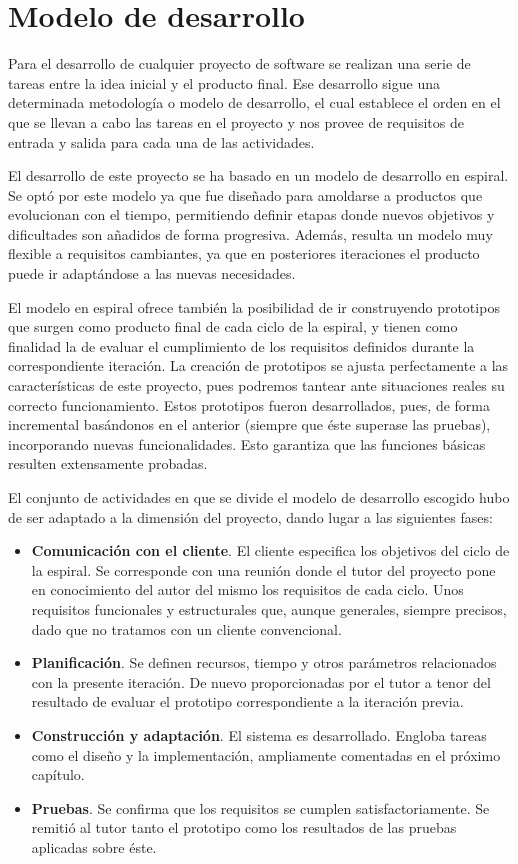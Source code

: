 \section{Modelo de desarrollo} \label{modelo}
Para el desarrollo de cualquier proyecto de software se realizan una serie de
tareas entre la idea inicial y el producto final. Ese desarrollo sigue una
determinada metodología o modelo de desarrollo, el cual
establece el orden en el que se llevan a cabo las tareas en el proyecto y
nos provee de requisitos de entrada y salida para cada una de las actividades.

El desarrollo de este proyecto se ha basado en un modelo de desarrollo
en espiral. Se optó por este modelo ya que fue diseñado para amoldarse a
productos que evolucionan con el tiempo, permitiendo definir etapas donde
nuevos objetivos y dificultades son añadidos de forma progresiva. Además,
resulta un modelo muy flexible a requisitos cambiantes, ya que en posteriores
iteraciones el producto puede ir adaptándose a las nuevas necesidades.

El modelo en espiral ofrece también la posibilidad de ir construyendo
prototipos que surgen como producto final de cada ciclo de la espiral,
y tienen como finalidad la de evaluar el cumplimiento de los requisitos
definidos durante la correspondiente iteración. La creación de prototipos
se ajusta perfectamente a las características de este proyecto, pues
podremos tantear ante situaciones reales su correcto funcionamiento.
Estos prototipos fueron desarrollados, pues, de forma incremental basándonos
en el anterior (siempre que éste superase las pruebas), incorporando nuevas
funcionalidades. Esto garantiza que las funciones básicas resulten extensamente
probadas.

El conjunto de actividades en que se divide el modelo de desarrollo escogido
hubo de ser adaptado a la dimensión del proyecto, dando lugar a las siguientes
fases:
\begin{itemize}
\item \textbf{Comunicación con el cliente}. El cliente especifica los objetivos
del ciclo de la espiral. Se corresponde con una reunión donde el tutor del
proyecto pone en conocimiento del autor del mismo los requisitos de cada ciclo.
Unos requisitos funcionales y estructurales que, aunque generales, siempre
precisos, dado que no tratamos con un cliente convencional.
\item \textbf{Planificación}. Se definen recursos, tiempo y otros parámetros
relacionados con la presente iteración. De nuevo proporcionadas por el tutor
a tenor del resultado de evaluar el prototipo correspondiente a la iteración
previa.
\item \textbf{Construcción y adaptación}. El sistema es desarrollado.
Engloba tareas como el diseño y la implementación, ampliamente comentadas en
el próximo capítulo.
\item \textbf{Pruebas}. Se confirma que los requisitos se cumplen satisfactoriamente.
Se remitió al tutor tanto el prototipo como los resultados de las pruebas
aplicadas sobre éste.
\end{itemize}

